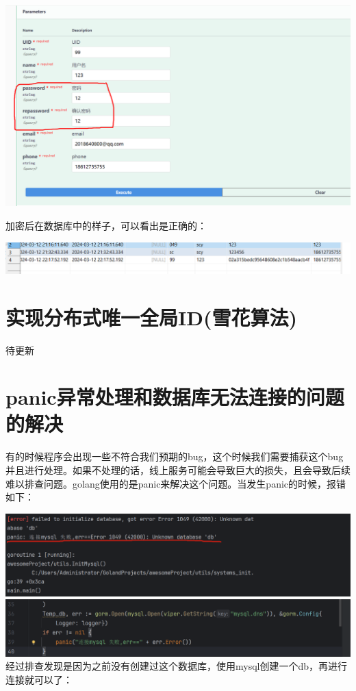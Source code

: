 \documentclass[12pt]{article}
\begin{document}
	
	\includegraphics{19.png}
	
	加密后在数据库中的样子，可以看出是正确的：
	
	\includegraphics[scale=0.7]{20.png}
	
	
	
	\section{实现分布式唯一全局ID(雪花算法)}
	待更新
	
	\section{panic异常处理和数据库无法连接的问题的解决}
	有的时候程序会出现一些不符合我们预期的bug，这个时候我们需要捕获这个bug并且进行处理。如果不处理的话，线上服务可能会导致巨大的损失，且会导致后续难以排查问题。golang使用的是panic来解决这个问题。当发生panic的时候，报错如下：
	
	\includegraphics[scale=0.5]{3.png}
	\includegraphics[scale=0.5]{4.png}
	经过排查发现是因为之前没有创建过这个数据库，使用mysql创建一个db，再进行连接就可以了：
	
\end{document}

